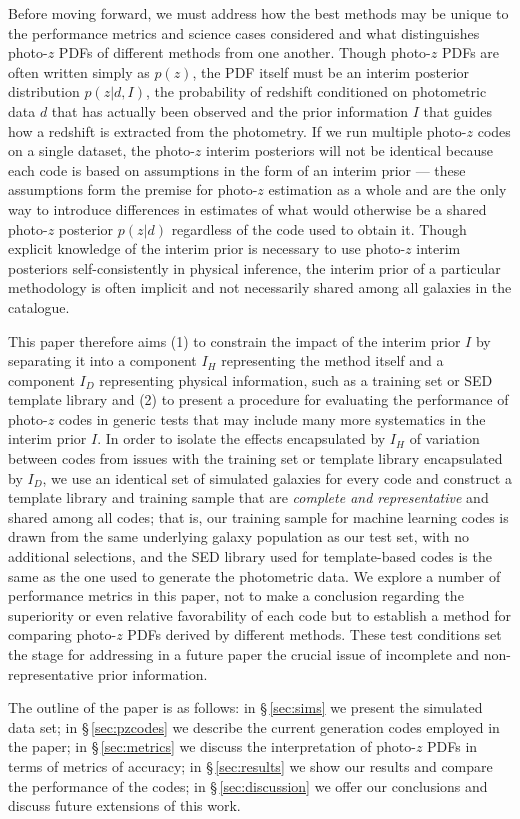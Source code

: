Before moving forward, we must address how the best methods may be unique to the performance metrics and science cases considered and what distinguishes photo-$z$ PDFs of different methods from one another.
Though photo-$z$ PDFs are often written simply as $p(z)$, the PDF itself must be an interim posterior distribution $p(z | d, I)$, the probability of redshift conditioned on photometric data $d$ that has actually been observed and the prior information $I$ that guides how a redshift is extracted from the photometry.
If we run multiple photo-$z$ codes on a single dataset, the photo-$z$ interim posteriors will not be identical because each code is based on assumptions in the form of an interim prior --- these assumptions form the premise for photo-$z$ estimation as a whole and are the only way to introduce differences in estimates of what would otherwise be a shared photo-$z$ posterior $p(z | d)$ regardless of the code used to obtain it.
Though explicit knowledge of the interim prior is necessary to use photo-$z$ interim posteriors self-consistently in physical inference, the interim prior of a particular methodology is often implicit and not necessarily shared among all galaxies in the catalogue.

This paper therefore aims (1) to constrain the impact of the interim prior $I$ by separating it into a component $I_{H}$ representing the method itself and a component $I_{D}$ representing physical information, such as a training set or SED template library and (2) to present a procedure for evaluating the performance of photo-$z$ codes in generic tests that may include many more systematics in the interim prior $I$.
In order to isolate the effects encapsulated by $I_{H}$ of variation between codes from issues with the training set or template library encapsulated by $I_{D}$, we use an identical set of simulated galaxies for every code and construct a template library and training sample that are {\it complete and representative} and shared among all codes; that is, our training sample for machine learning codes is drawn from the same underlying galaxy population as our test set, with no additional selections, and the SED library used for template-based codes is the same as the one used to generate the photometric data.
We explore a number of performance metrics in this paper, not to make a conclusion regarding the superiority or even relative favorability of each code but to establish a method for comparing photo-$z$ PDFs derived by different methods.
These test conditions set the stage for addressing in a future paper the crucial issue of incomplete and non-representative prior information.

The outline of the paper is as follows: in \S\,\ref{sec:sims} we present the simulated data set; in \S\,\ref{sec:pzcodes} we describe the current generation codes employed in the paper;  in \S\,\ref{sec:metrics} we discuss the interpretation of photo-$z$ PDFs in terms of metrics of accuracy; in \S\,\ref{sec:results} we show our results and compare the performance of the codes; in \S\,\ref{sec:discussion} we offer our conclusions and discuss future extensions of this work.
